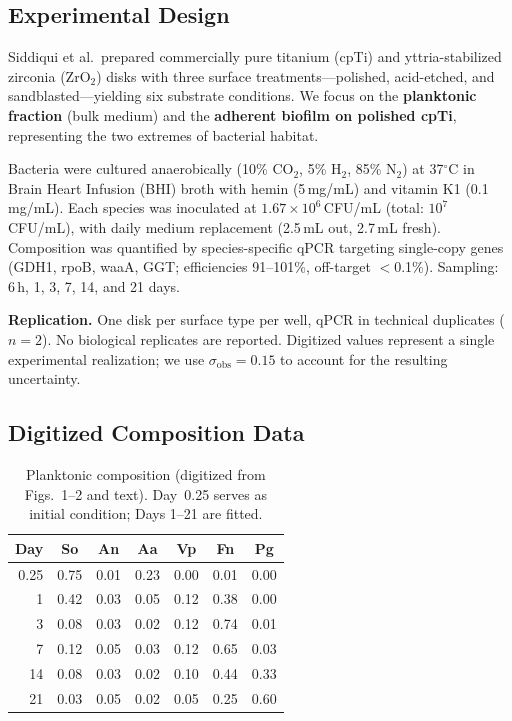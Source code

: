 \documentclass[11pt,a4paper]{article}
\begin{document}
\subsection{Experimental Design}

Siddiqui et al.\ prepared commercially pure titanium (cpTi) and yttria-stabilized
zirconia (ZrO$_2$) disks with three surface treatments---polished, acid-etched, and
sandblasted---yielding six substrate conditions. We focus on the \textbf{planktonic
fraction} (bulk medium) and the \textbf{adherent biofilm on polished cpTi},
representing the two extremes of bacterial habitat.

Bacteria were cultured anaerobically (10\% CO$_2$, 5\% H$_2$, 85\% N$_2$) at
37$^\circ$C in Brain Heart Infusion (BHI) broth with hemin (5\,mg/mL) and
vitamin K1 (0.1\,mg/mL). Each species was inoculated at $1.67 \times 10^6$\,CFU/mL
(total: $10^7$\,CFU/mL), with daily medium replacement (2.5\,mL out, 2.7\,mL fresh).
Composition was quantified by species-specific qPCR targeting single-copy genes
(GDH1, rpoB, waaA, GGT; efficiencies 91--101\%, off-target $<$0.1\%).
Sampling: 6\,h, 1, 3, 7, 14, and 21 days.

\textbf{Replication.} One disk per surface type per well, qPCR in technical
duplicates ($n=2$). No biological replicates are reported. Digitized values
represent a single experimental realization; we use $\sigma_\mathrm{obs} = 0.15$
to account for the resulting uncertainty.

\subsection{Digitized Composition Data}

\begin{table}[H]\centering\small
\caption{Planktonic composition (digitized from Figs.\ 1--2 and text).
Day~0.25 serves as initial condition; Days 1--21 are fitted.}
\label{tab:plan_data}
\begin{tabular}{rcccccc}
\toprule
Day & So & An & Aa & Vp & Fn & Pg \\
\midrule
0.25 & 0.75 & 0.01 & 0.23 & 0.00 & 0.01 & 0.00 \\
1    & 0.42 & 0.03 & 0.05 & 0.12 & 0.38 & 0.00 \\
3    & 0.08 & 0.03 & 0.02 & 0.12 & 0.74 & 0.01 \\
7    & 0.12 & 0.05 & 0.03 & 0.12 & 0.65 & 0.03 \\
14   & 0.08 & 0.03 & 0.02 & 0.10 & 0.44 & 0.33 \\
21   & 0.03 & 0.05 & 0.02 & 0.05 & 0.25 & 0.60 \\
\bottomrule
\end{tabular}
\end{table}
\end{document}
